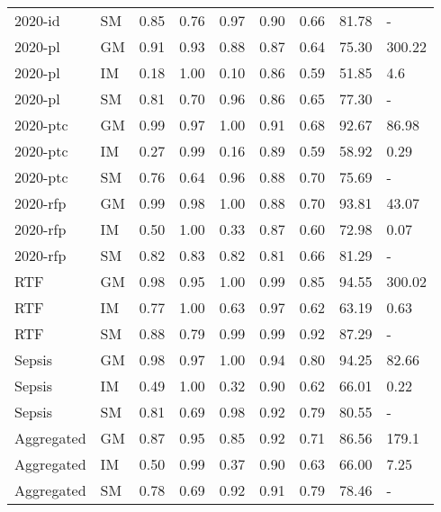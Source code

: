 \begin{tabular}{llrrrrrrl}
2020-id & SM & 0.85 & 0.76 & 0.97 & 0.90 & 0.66 & 81.78 & - \\
2020-pl & GM & 0.91 & 0.93 & 0.88 & 0.87 & 0.64 & 75.30 & 300.22 \\
2020-pl & IM & 0.18 & 1.00 & 0.10 & 0.86 & 0.59 & 51.85 & 4.6 \\
2020-pl & SM & 0.81 & 0.70 & 0.96 & 0.86 & 0.65 & 77.30 & - \\
2020-ptc & GM & 0.99 & 0.97 & 1.00 & 0.91 & 0.68 & 92.67 & 86.98 \\
2020-ptc & IM & 0.27 & 0.99 & 0.16 & 0.89 & 0.59 & 58.92 & 0.29 \\
2020-ptc & SM & 0.76 & 0.64 & 0.96 & 0.88 & 0.70 & 75.69 & - \\
2020-rfp & GM & 0.99 & 0.98 & 1.00 & 0.88 & 0.70 & 93.81 & 43.07 \\
2020-rfp & IM & 0.50 & 1.00 & 0.33 & 0.87 & 0.60 & 72.98 & 0.07 \\
2020-rfp & SM & 0.82 & 0.83 & 0.82 & 0.81 & 0.66 & 81.29 & - \\
RTF & GM & 0.98 & 0.95 & 1.00 & 0.99 & 0.85 & 94.55 & 300.02 \\
RTF & IM & 0.77 & 1.00 & 0.63 & 0.97 & 0.62 & 63.19 & 0.63 \\
RTF & SM & 0.88 & 0.79 & 0.99 & 0.99 & 0.92 & 87.29 & - \\
Sepsis & GM & 0.98 & 0.97 & 1.00 & 0.94 & 0.80 & 94.25 & 82.66 \\
Sepsis & IM & 0.49 & 1.00 & 0.32 & 0.90 & 0.62 & 66.01 & 0.22 \\
Sepsis & SM & 0.81 & 0.69 & 0.98 & 0.92 & 0.79 & 80.55 & - \\
Aggregated & GM & 0.87 & 0.95 & 0.85 & 0.92 & 0.71 & 86.56 & 179.1 \\
Aggregated & IM & 0.50 & 0.99 & 0.37 & 0.90 & 0.63 & 66.00 & 7.25 \\
Aggregated & SM & 0.78 & 0.69 & 0.92 & 0.91 & 0.79 & 78.46 & - \\
\bottomrule
\end{tabular}
